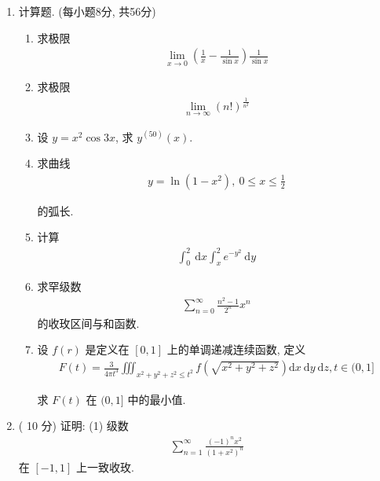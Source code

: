 \documentclass[space]{ctexart} %
\def\leq{\leqslant}
\begin{document}
\vspace*{0.5cm}
\begin{enumerate}[itemsep=1.2em,label=\arabic*.,topsep=0pt,left=0em]
\item 计算题. (每小题8分, 共56分)


\setcounter{enumii}{0}
\begin{enumerate}[itemsep=1.2em,label=(\arabic*),topsep=0pt,left=2em] %
	\item 求极限
\begin{align*}
\lim _{x \rightarrow 0}\left(\frac{1}{x}-\frac{1}{\sin x}\right) \frac{1}{\sin x}
\end{align*}

\item 求极限
\begin{align*}
\lim _{n \rightarrow \infty}(n !)^{\frac{1}{n^{2}}}
\end{align*}

\item 设 $ y=x^{2} \cos 3 x $, 求 $ y^{(50)}(x)$.

\item 求曲线
\begin{align*}
y=\ln \left(1-x^{2}\right), ~0 \leq x \leq \frac{1}{2}
\end{align*}

的弧长.
\item 计算
\begin{align*}
\int_{0}^{2} \mathrm{~d} x \int_{x}^{2} e^{-y^{2}} \mathrm{~d} y
\end{align*}

\item 求罕级数
\begin{align*}
\sum_{n=0}^{\infty} \frac{n^{2}-1}{2^{n}} x^{n}
\end{align*}
的收玫区间与和函数.

\item 设  $f(r)$  是定义在 $ [0,1] $ 上的单调递减连续函数, 定义
\begin{align*}
F(t)=\frac{3}{4 \pi t^{3}} \iiint_{x^{2}+y^{2}+z^{2} \leq t^{2}} f\left(\sqrt{x^{2}+y^{2}+z^{2}}\right) \mathrm{d} x \mathrm{~d} y \mathrm{~d} z, t \in(0,1]
\end{align*}

求 $ F(t) $ 在 $ (0,1]$  中的最小值.

\end{enumerate}

\item  ( 10 分)  证明:  (1)  级数
\begin{align*}
\sum_{n=1}^{\infty} \frac{(-1)^{n} x^{2}}{\left(1+x^{2}\right)^{n}}
\end{align*}
在  $[-1,1] $ 上一致收玫.


\end{enumerate}
\end{document}
